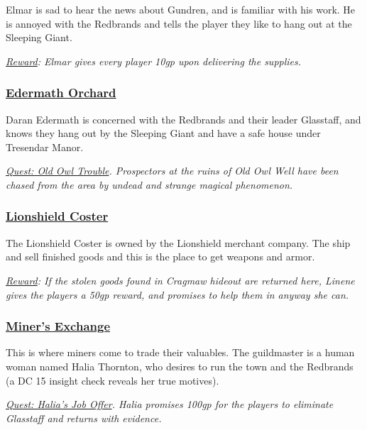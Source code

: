 Elmar is sad to hear the news about Gundren, and is familiar with his work. He is annoyed with the Redbrands and tells the player they like to hang out at the Sleeping Giant.

\emph{\underline{Reward}: Elmar gives every player 10gp upon delivering the supplies.}

\subsubsection*{\underline{Edermath Orchard}}
Daran Edermath is concerned with the Redbrands and their leader Glasstaff, and knows they hang out by the Sleeping Giant and have a safe house under Tresendar Manor.

\emph{\underline{Quest: Old Owl Trouble}. Prospectors at the ruins of Old Owl Well have been chased from the area by undead and strange magical phenomenon. }


\subsubsection*{\underline{Lionshield Coster}}
The Lionshield Coster is owned by the Lionshield merchant company. The ship and sell finished goods and this is the place to get weapons and armor. 

\emph{\underline{Reward}: If the stolen goods found in Cragmaw hideout are returned here, Linene gives the players a 50gp reward, and promises to help them in anyway she can.}

\subsubsection*{\underline{Miner's Exchange}}
This is where miners come to trade their valuables. The guildmaster is a human woman named Halia Thornton, who desires to run the town and the Redbrands (a DC 15 insight check reveals her true motives). 

\emph{\underline{Quest: Halia's Job Offer}. Halia promises 100gp for the players to eliminate Glasstaff and returns with evidence. }

